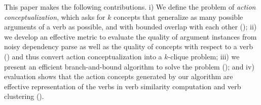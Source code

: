 This paper makes the following contributions.
i) We define the problem of {\em action conceptualization}, which
asks for $k$ concepts that generalize as many possible arguments
of a verb as possible, and with bounded overlap with each other
();
ii) we develop an effective metric to evaluate the quality of argument
instances from noisy dependency parse as well as the quality of concepts with
respect to a verb () and thus convert action conceptualization
into a $k$-clique problem;
iii) we present an efficient branch-and-bound algorithm to
solve the problem (); and
iv) evaluation shows that the action concepts generated by
our algorithm are effective representation of the verbs
in verb similarity computation and verb clustering ().

%


